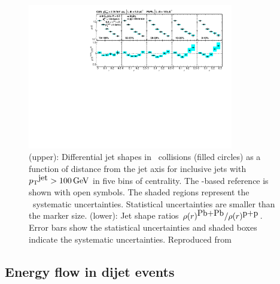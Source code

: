 \begin{figure}[!ht]
\begin{center}
\includegraphics[width=0.8\textwidth]{jetfigures/cms_shape_Figure2.pdf}
\caption{
%
(upper): Differential jet shapes in \PbPb\ collisions (filled circles)
as a function of distance from the jet axis for inclusive jets with $\mbox{$p_{\mathrm{T}}$}^{\mbox{jet}} >100\,\mathrm{GeV}$
in five bins of centrality.  The \pp-based reference is shown with open symbols.
The shaded regions represent the \PbPb\ systematic uncertainties.
Statistical uncertainties are smaller than the marker size.
(lower): Jet shape ratios $\rho(r)^{\mbox{Pb+Pb}}/\rho(r)^{\mbox{p+p}}$.
Error bars show the statistical uncertainties and shaded boxes indicate the systematic uncertainties. 
Reproduced from~\cite{Chatrchyan:2013kwa}
}
\label{fig:pas:CMS_shape}
\end{center}
\end{figure}

\subsection{Energy flow in dijet events}


